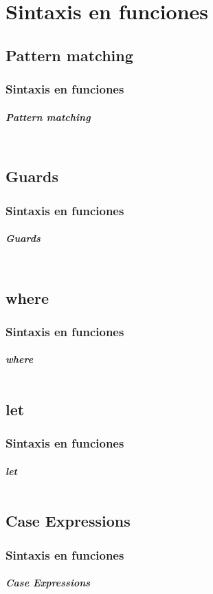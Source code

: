 \section{Sintaxis en funciones}
\subsection{Pattern matching}
\begin{frame}[fragile]
  \frametitle{Sintaxis en funciones}
  \framesubtitle{\emph{Pattern matching}}
  {\color{white}
    \inputminted[bgcolor=bg]{haskell}{code/funciones01.hs}
  }
  {\color{white}
    \inputminted[bgcolor=bg]{text}{code/funciones02.txt}
  }
\end{frame}

\subsection{Guards}
\begin{frame}[fragile]
  \frametitle{Sintaxis en funciones}
  \framesubtitle{\emph{Guards}}
  {\color{white}
    \inputminted[bgcolor=bg]{haskell}{code/funciones03.hs}
  }
  {\color{white}
    \inputminted[bgcolor=bg]{text}{code/funciones04.txt}
  }
\end{frame}

\subsection{where}
\begin{frame}[fragile]
  \frametitle{Sintaxis en funciones}
  \framesubtitle{\emph{where}}
  {\color{white}
    \inputminted[bgcolor=bg]{haskell}{code/funciones05.hs}
  }
\end{frame}
\subsection{let}
\begin{frame}[fragile]
  \frametitle{Sintaxis en funciones}
  \framesubtitle{\emph{let}}
  {\color{white}
    \inputminted[bgcolor=bg]{haskell}{code/funciones06.hs}
  }
\end{frame}
\subsection{Case Expressions}
\begin{frame}[fragile]
  \frametitle{Sintaxis en funciones}
  \framesubtitle{\emph{Case Expressions}}
  {\color{white}
    \inputminted[bgcolor=bg]{haskell}{code/funciones07.hs}
  }
\end{frame}